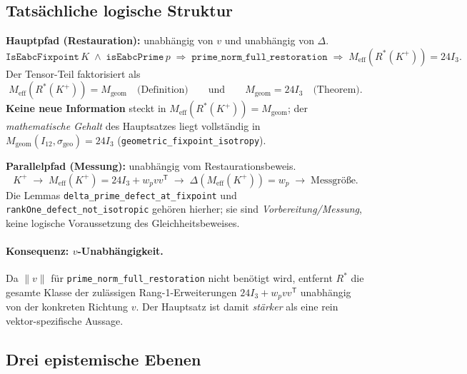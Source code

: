 \documentclass[11pt,a4paper]{article}
\begin{document}
	\subsection{Tatsächliche logische Struktur}
	
	\textbf{Hauptpfad (Restauration):} unabhängig von $v$ und unabhängig von $\Delta$.
	\[
	\texttt{IsEabcFixpoint}\,K
	\;\wedge\;
	\texttt{isEabcPrime}\,p
	\;\Longrightarrow\;
	\texttt{prime\_norm\_full\_restoration}
	\;\Longrightarrow\;
	M_{\mathrm{eff}}(R^*(K^+))=24I_3.
	\]
	Der Tensor-Teil faktorisiert als
	\[
	M_{\mathrm{eff}}(R^*(K^+))=M_{\mathrm{geom}}
	\quad\text{(Definition)}
	\qquad\text{und}\qquad
	M_{\mathrm{geom}}=24I_3
	\quad\text{(Theorem)}.
	\]
	\textbf{Keine neue Information} steckt in $M_{\mathrm{eff}}(R^*(K^+))=M_{\mathrm{geom}}$;
	der \emph{mathematische Gehalt} des Hauptsatzes liegt vollständig in
	$M_{\mathrm{geom}}(I_{12},\sigma_{\mathrm{geo}})=24I_3$
	(\texttt{geometric\_fixpoint\_isotropy}).
	
	\medskip\noindent
	\textbf{Parallelpfad (Messung):} unabhängig vom Restaurationsbeweis.
	\[
	K^+ \;\longrightarrow\; M_{\mathrm{eff}}(K^+)=24I_3+w_pvv^{\mathsf T}
	\;\longrightarrow\; \Delta(M_{\mathrm{eff}}(K^+))=w_p
	\;\longrightarrow\; \text{Messgröße}.
	\]
	Die Lemmas \texttt{delta\_prime\_defect\_at\_fixpoint} und
	\texttt{rankOne\_defect\_not\_isotropic} gehören hierher; sie sind
	\emph{Vorbereitung/Messung}, keine logische Voraussetzung des Gleichheitsbeweises.
	
	\paragraph{Konsequenz: $v$-Unabhängigkeit.}
	Da $\|v\|$ für \texttt{prime\_norm\_full\_restoration} nicht benötigt wird,
	entfernt $R^*$ die gesamte Klasse der zulässigen Rang-1-Erweiterungen
	$24I_3+w_pvv^{\mathsf T}$ unabhängig von der konkreten Richtung $v$.
	Der Hauptsatz ist damit \emph{stärker} als eine rein vektor-spezifische Aussage.
	
	\subsection{Drei epistemische Ebenen}
	
\end{document}
